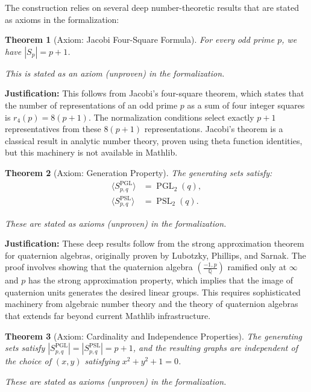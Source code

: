 \documentclass[11pt]{article}
\theoremstyle{plain}
\newtheorem*{theorem}{Theorem}
\theoremstyle{definition}
\theoremstyle{remark}
\begin{document}
The construction relies on several deep number-theoretic results that are stated as axioms in the formalization:

\begin{theorem}[Axiom: Jacobi Four-Square Formula]
For every odd prime $p$, we have $|S_p| = p + 1$.

\textit{This is stated as an axiom (unproven) in the formalization.}
\end{theorem}

\textbf{Justification:} This follows from Jacobi's four-square theorem, which states that the number of representations of an odd prime $p$ as a sum of four integer squares is $r_4(p) = 8(p+1)$. The normalization conditions select exactly $p+1$ representatives from these $8(p+1)$ representations. Jacobi's theorem is a classical result in analytic number theory, proven using theta function identities, but this machinery is not available in Mathlib.

\begin{theorem}[Axiom: Generation Property] 
The generating sets satisfy:
\begin{align}
\langle S_{p,q}^{\operatorname{PGL}} \rangle &= \operatorname{PGL}_2(q), \\
\langle S_{p,q}^{\operatorname{PSL}} \rangle &= \operatorname{PSL}_2(q).
\end{align}

\textit{These are stated as axioms (unproven) in the formalization.}
\end{theorem}

\textbf{Justification:} These deep results follow from the strong approximation theorem for quaternion algebras, originally proven by Lubotzky, Phillips, and Sarnak. The proof involves showing that the quaternion algebra $\left(\frac{-1,p}{\mathbb{Q}}\right)$ ramified only at $\infty$ and $p$ has the strong approximation property, which implies that the image of quaternion units generates the desired linear groups. This requires sophisticated machinery from algebraic number theory and the theory of quaternion algebras that extends far beyond current Mathlib infrastructure.

\begin{theorem}[Axiom: Cardinality and Independence Properties]
The generating sets satisfy $|S_{p,q}^{\operatorname{PGL}}| = |S_{p,q}^{\operatorname{PSL}}| = p + 1$, and the resulting graphs are independent of the choice of $(x,y)$ satisfying $x^2 + y^2 + 1 = 0$.

\textit{These are stated as axioms (unproven) in the formalization.}
\end{theorem}
\end{document}
